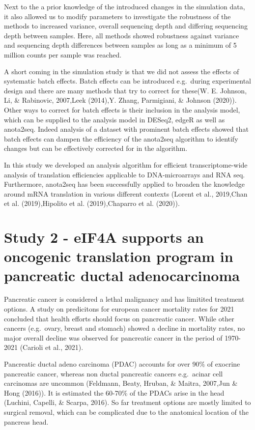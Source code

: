 \documentclass[12pt,openany]{book}
\begin{document}
Next to the a prior knowledge of the introduced changes in the
simulation data, it also allowed us to modify parameters to investigate
the robustness of the methods to increased variance, overall sequencing
depth and differing sequencing depth between samples. Here, all methods
showed robustness against variance and sequencing depth differences
between samples as long as a minimum of 5 million counts per sample was
reached.

A short coming in the simulation study is that we did not assess the
effects of systematic batch effects. Batch effects can be introduced
e.g.~during experimental design and there are many methods that try to
correct for these(W. E. Johnson, Li, \& Rabinovic, 2007,Leek (2014),Y.
Zhang, Parmigiani, \& Johnson (2020)). Other ways to correct for batch
effects is their inclusion in the analysis model, which can be supplied
to the analysis model in DESeq2, edgeR as well as anota2seq. Indeed
analysis of a dataset with prominent batch effects showed that batch
effects can dampen the efficiency of the anota2seq algorithm to identify
changes but can be effectively corrected for in the algorithm.

In this study we developed an analysis algorithm for efficient
transcriptome-wide analysis of translation efficiencies applicable to
DNA-microarrays and RNA seq. Furthermore, anota2seq has been
successfully applied to broaden the knowledge around mRNA translation in
various different contexts (Lorent et al., 2019,Chan et al.
(2019),Hipolito et al. (2019),Chaparro et al. (2020)).

\section{Study 2 - eIF4A supports an oncogenic translation program in pancreatic ductal adenocarcinoma}

Pancreatic cancer is considered a lethal malignancy and has limitited
treatment options. A study on predicitons for european cancer mortality
rates for 2021 concluded that health efforts should focus on pancreatic
cancer. While other cancers (e.g.~ovary, breast and stomach) showed a
decline in mortality rates, no major overall decline was observed for
pancreatic cancer in the period of 1970-2021 (Carioli et al., 2021).

Pancreatic ductal adeno carcinoma (PDAC) accounts for over 90\% of
exocrine pancreatic cancer, whereas non ductal pancreatic cancers
e.g.~acinar cell carcinomas are uncommon (Feldmann, Beaty, Hruban, \&
Maitra, 2007,Jun \& Hong (2016)). It is estimated the 60-70\% of the
PDACs arise in the head (Luchini, Capelli, \& Scarpa, 2016). So far
treatment options are mostly limited to surgical removal, which can be
complicated due to the anatomical location of the pancreas head.
\end{document}
